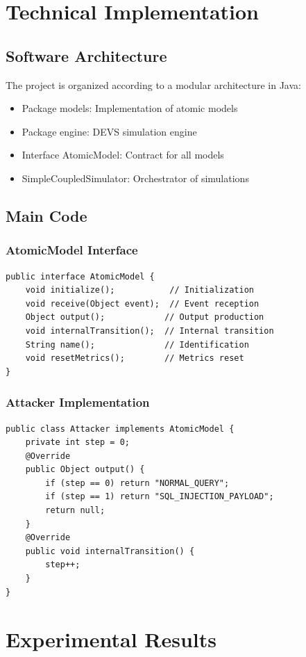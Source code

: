 \documentclass{article}
\begin{document}
\section{Technical Implementation}
\subsection{Software Architecture}
The project is organized according to a modular architecture in Java:
\begin{itemize}
    \item Package models: Implementation of atomic models
    \item Package engine: DEVS simulation engine
    \item Interface AtomicModel: Contract for all models
    \item SimpleCoupledSimulator: Orchestrator of simulations
\end{itemize}

\subsection{Main Code}
\subsubsection{AtomicModel Interface}
\begin{verbatim}
public interface AtomicModel {
    void initialize();           // Initialization
    void receive(Object event);  // Event reception
    Object output();            // Output production
    void internalTransition();  // Internal transition
    String name();              // Identification
    void resetMetrics();        // Metrics reset
}
\end{verbatim}

\subsubsection{Attacker Implementation}
\begin{verbatim}
public class Attacker implements AtomicModel {
    private int step = 0;
    @Override
    public Object output() {
        if (step == 0) return "NORMAL_QUERY";
        if (step == 1) return "SQL_INJECTION_PAYLOAD";
        return null;
    }
    @Override
    public void internalTransition() {
        step++;
    }
}
\end{verbatim}

\section{Experimental Results}
\end{document}
